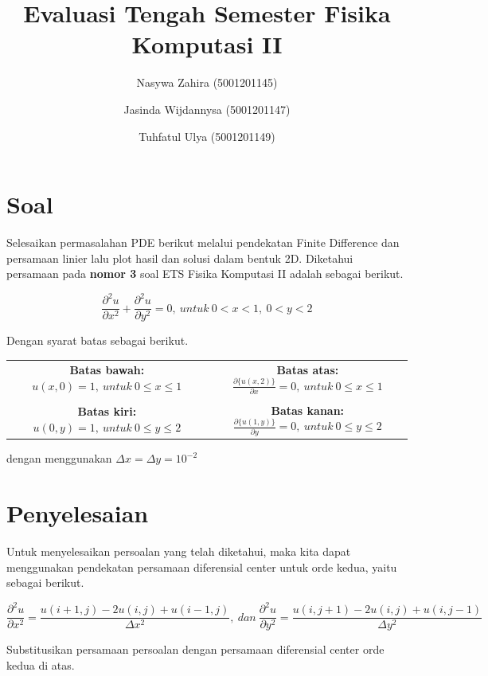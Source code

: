 \documentclass{article}
\title{\textbf{Evaluasi Tengah Semester Fisika Komputasi II}}
\author[1]{Nasywa Zahira (5001201145)}
\author[1]{Jasinda Wijdannysa (5001201147)}
\author[1]{Tuhfatul Ulya (5001201149)}
\affil[1]{Departemen Fisika, Institut Teknologi Sepuluh Nopember}
\date{}
\begin{document}
\maketitle

\section{Soal}

Selesaikan permasalahan PDE berikut melalui pendekatan Finite Difference dan persamaan linier lalu plot hasil dan solusi dalam bentuk 2D. Diketahui persamaan pada \textbf{nomor 3} soal ETS Fisika Komputasi II adalah sebagai berikut.

\[ \frac{\partial^2 u}{\partial x^2}+{\frac{\partial^2 u}{\partial y^2}}=0,\ untuk\ {0<x<1},\ {0<y<2}\] 

\begin{center}
Dengan syarat batas sebagai berikut.
\end{center}

\begin{center}
\begin{tabular}{c|c}
     \textbf{Batas bawah:} \({u(x,0)=1},\ untuk\ {0\le x \le 1}\) &  \textbf{Batas atas:} \( \frac{\partial \{u(x,2)\}}{\partial x}=0,\ untuk\ {0 \le x \le 1}\)\\
     \\
     \textbf{Batas kiri:} \({u(0,y)=1},\ untuk\ {0 \le y \le 2}\) &  \textbf{Batas kanan:} \( \frac{\partial \{u(1,y)\}}{\partial y}=0,\ untuk\ {0 \le y \le 2}\)
\end{tabular}
\end{center}

\begin{center}
    dengan menggunakan \(\Delta x=\Delta y=10^{-2}\)
\end{center}

\bigskip

\section{Penyelesaian}
Untuk menyelesaikan persoalan yang telah diketahui, maka kita dapat menggunakan pendekatan persamaan diferensial center untuk orde kedua, yaitu sebagai berikut.

\[\frac{\partial^2 u}{\partial x^2}= \frac {u(i+1,j)-2u(i,j)+u(i-1,j)}{\Delta x^2},\ dan\ \frac{\partial^2 u}{\partial y^2}= \frac {u(i,j+1)-2u(i,j)+u(i,j-1)}{\Delta y^2}\]

Substitusikan persamaan persoalan dengan persamaan diferensial center orde kedua di atas.
\end{document}
